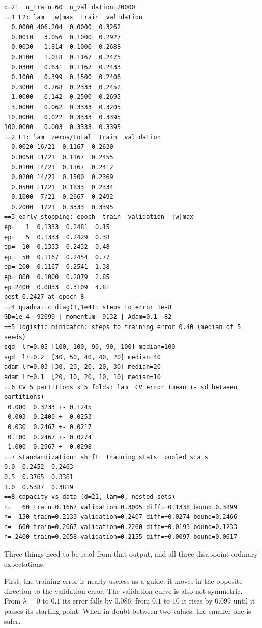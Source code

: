\begin{verbatim}
d=21  n_train=60  n_validation=20000
==1 L2: lam  |w|max  train  validation
  0.0000 406.204  0.0000  0.3262
  0.0010   3.056  0.1000  0.2927
  0.0030   1.814  0.1000  0.2688
  0.0100   1.018  0.1167  0.2475
  0.0300   0.631  0.1167  0.2433
  0.1000   0.399  0.1500  0.2406
  0.3000   0.268  0.2333  0.2452
  1.0000   0.142  0.2500  0.2695
  3.0000   0.062  0.3333  0.3205
 10.0000   0.022  0.3333  0.3395
100.0000   0.003  0.3333  0.3395
==2 L1: lam  zeros/total  train  validation
  0.0020 16/21  0.1167  0.2630
  0.0050 11/21  0.1167  0.2455
  0.0100 14/21  0.1167  0.2412
  0.0200 14/21  0.1500  0.2369
  0.0500 11/21  0.1833  0.2334
  0.1000  7/21  0.2667  0.2492
  0.2000  1/21  0.3333  0.3395
==3 early stopping: epoch  train  validation  |w|max
ep=   1  0.1333  0.2481  0.15
ep=   5  0.1333  0.2429  0.38
ep=  10  0.1333  0.2432  0.48
ep=  50  0.1167  0.2454  0.77
ep= 200  0.1167  0.2541  1.38
ep= 800  0.1000  0.2879  2.85
ep=2400  0.0833  0.3109  4.81
best 0.2427 at epoch 8
==4 quadratic diag(1,1e4): steps to error 1e-8
GD=1e-4  92099 | momentum  9132 | Adam=0.1  82
==5 logistic minibatch: steps to training error 0.40 (median of 5 seeds)
sgd  lr=0.05 [100, 100, 90, 90, 100] median=100
sgd  lr=0.2  [30, 50, 40, 40, 20] median=40
adam lr=0.03 [30, 20, 20, 20, 30] median=20
adam lr=0.1  [20, 10, 20, 10, 10] median=10
==6 CV 5 partitions x 5 folds: lam  CV error (mean +- sd between partitions)
 0.000  0.3233 +- 0.1245
 0.003  0.2400 +- 0.0253
 0.030  0.2467 +- 0.0217
 0.100  0.2467 +- 0.0274
 1.000  0.2967 +- 0.0298
==7 standardization: shift  training stats  pooled stats
0.0  0.2452  0.2463
0.5  0.3765  0.3361
1.0  0.5387  0.3819
==8 capacity vs data (d=21, lam=0, nested sets)
n=   60 train=0.1667 validation=0.3005 diff=+0.1338 bound=0.3899
n=  150 train=0.2133 validation=0.2407 diff=+0.0274 bound=0.2466
n=  600 train=0.2067 validation=0.2260 diff=+0.0193 bound=0.1233
n= 2400 train=0.2058 validation=0.2155 diff=+0.0097 bound=0.0617
\end{verbatim}

Three things need to be read from that output, and all three disappoint ordinary
expectations.

First, the training error is nearly useless as a guide: it moves in the opposite
direction to the validation error. The validation curve is also not symmetric. From
$\lambda=0$ to $0.1$ its error falls by $0.086$; from $0.1$ to $10$ it rises by $0.099$
until it passes its starting point. When in doubt between two values, the smaller one
is safer.


